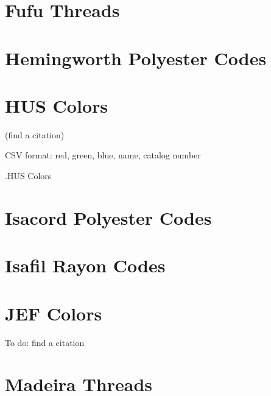 \documentclass[a4paper]{report}
\begin{document}
%

\section{Fufu Threads}

%

%

\section{Hemingworth Polyester Codes}

%

\section{HUS Colors}

(find a citation)

CSV format: red, green, blue, name, catalog number

.HUS Colors

%

\section{Isacord Polyester Codes}

%

\section{Isafil Rayon Codes}

%

\section{JEF Colors}

To do: find a citation

%

\section{Madeira Threads}

%
\end{document}
